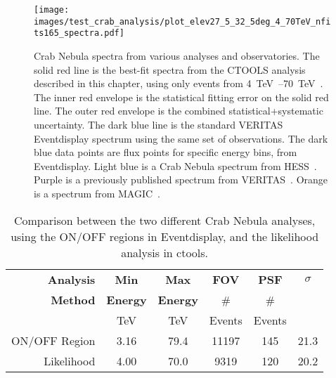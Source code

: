 \begin{figure}[!t]
  \centering
  \texttt{[image: images/test\_crab\_analysis/plot\_elev27\_5\_32\_5deg\_4\_70TeV\_nfits165\_spectra.pdf]}
  \caption[Crab Nebula Spectra]
  {
    Crab Nebula spectra from various analyses and observatories.
    The solid red line is the best-fit spectra from the CTOOLS analysis described in this chapter, using only events from \SIrange{4}{70}{\TeV{}}.
    The inner red envelope is the statistical fitting error on the solid red line.
    The outer red envelope is the combined statistical+systematic uncertainty.
    The dark blue line is the standard VERITAS Eventdisplay spectrum using the same set of observations.
    The dark blue data points are flux points for specific energy bins, from Eventdisplay.
    Light blue is a Crab Nebula spectrum from HESS~\cite{hess2006crab}.
    Purple is a previously published spectrum from VERITAS~\cite{veritas2015crab}.
    Orange is a spectrum from MAGIC~\cite{magic2015crab}.
  }
  \label{fig:crab_test_spectra}
\end{figure}
  
\begin{table}[!t]
  \centering
  \begin{tabular}{|r|c|c|c|c|c|}
    \hline
    \textbf{Analysis} & \textbf{Min}    & \textbf{Max}    & \textbf{FOV} & \textbf{PSF} & \textbf{$\sigma$} \\
    \textbf{Method}   & \textbf{Energy} & \textbf{Energy} &  \#          & \#           &                   \\
                      & TeV             & TeV             &  Events      & Events       &                   \\
    \hline 
    ON/OFF Region & 3.16 & 79.4 & 11197 & 145 & 21.3 \\
    Likelihood    & 4.00 & 70.0 & 9319  & 120 & 20.2 \\
    \hline 
  \end{tabular}
  \caption[Analysis Comparison]{
    Comparison between the two different Crab Nebula analyses, using the ON/OFF regions in Eventdisplay, and the likelihood analysis in ctools.
  }
  \label{tab:crab_statistics}
\end{table}

